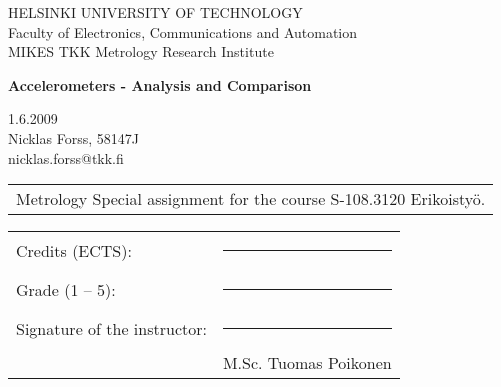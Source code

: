 \begin{flushleft}
HELSINKI UNIVERSITY OF TECHNOLOGY \\
Faculty of Electronics, Communications and Automation \\
MIKES TKK Metrology Research Institute \\

\vspace{4cm}

\begin{center}

{\LARGE{ \bf Accelerometers - Analysis and Comparison}}\\	

\vspace{3cm}

1.6.2009\\ 		
Nicklas Forss, 58147J\\ 
nicklas.forss@tkk.fi\\

\end{center}

\vspace{3.0cm}

\begin{tabular}{l}
\vspace{0.3cm} Metrology Special assignment for the course S-108.3120 Erikoisty\"o.\\
\end{tabular}

\begin{tabular}{ll}
\vspace{0.3cm} Credits (ECTS): &\rule{3cm}{.2pt}\\
\vspace{0.3cm} Grade (1 -- 5): &\rule{3cm}{.2pt}\\
Signature of the instructor: &\rule{8cm}{.2pt}\\

\vspace{0.3cm} & M.Sc. Tuomas Poikonen\\


\end{tabular}
\end{flushleft}

\clearpage
